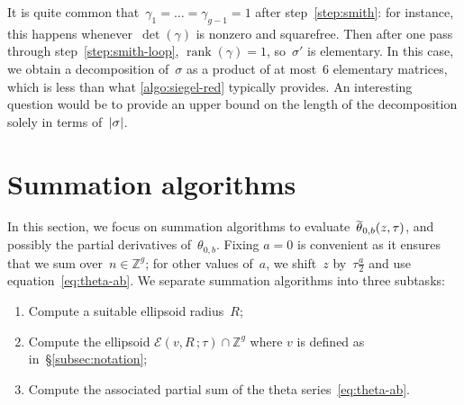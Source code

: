 \documentclass[12pt,oneside]{amsart}
\numberwithin{equation}{section}
\theoremstyle{definition}
\newtheorem{rem}[equation]{Remark}
\newcommand{\Z}{\mathbb{Z}}
\newcommand{\eld}[3]{\ensuremath{\mathcal{E}(#1, #2\,; #3)}}
\DeclareMathOperator{\thetatilde}{\rlap{\raisebox{-0.1ex}{$\widetilde{\phantom{\,t}}$}}\theta}
\DeclareMathOperator{\rank}{rank}
\DeclarePairedDelimiter{\abs}{|}{|}
\begin{document}
It is quite common that~$\gamma_1 = \ldots = \gamma_{g-1} = 1$ after
step~\eqref{step:smith}: for instance, this happens whenever~$\det(\gamma)$ is
nonzero and squarefree. Then after one pass through
step~\eqref{step:smith-loop}, $\rank(\gamma) = 1$, so~$\sigma'$ is
elementary. In this case, we obtain a decomposition of~$\sigma$ as a product of
at most~6 elementary matrices, which is less than what \cref{algo:siegel-red}
typically provides. An interesting question would be to provide an upper bound
on the length of the decomposition solely in terms of~$\abs{\sigma}$.


\section{Summation algorithms}
\label{sec:summation}

In this section, we focus on summation algorithms to
evaluate~$\thetatilde_{0,b}(z,\tau)$, and possibly the partial derivatives
of~$\theta_{0,b}$. Fixing $a=0$ is convenient as it ensures that we sum
over~$n\in \Z^g$; for other values of~$a$, we shift~$z$ by~$\tau\tfrac a2$ and
use equation~\eqref{eq:theta-ab}. We separate summation algorithms into three
subtasks:
\begin{enumerate}
\item Compute a suitable ellipsoid radius~$R$;
\item Compute the ellipsoid $\eld{v}{R}{\tau} \cap \Z^g$ where $v$ is defined
  as in~§\ref{subsec:notation};
\item Compute the associated partial sum of the theta
  series~\eqref{eq:theta-ab}.
\end{enumerate}
\end{document}
